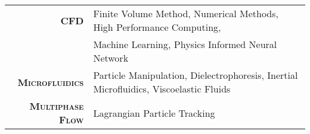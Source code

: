 
\vspace{10pt}

\begin{tabular}{rl}
  \textsc{\textbf{CFD}}             & Finite Volume Method, Numerical Methods, High Performance Computing, \\
                                    & Machine Learning, Physics Informed Neural Network \\
  \textsc{\textbf{Microfluidics}}   & Particle Manipulation, Dielectrophoresis, Inertial Microfluidics, Viscoelastic Fluids \\
  \textsc{\textbf{Multiphase Flow}} & Lagrangian Particle Tracking \\
\end{tabular}
